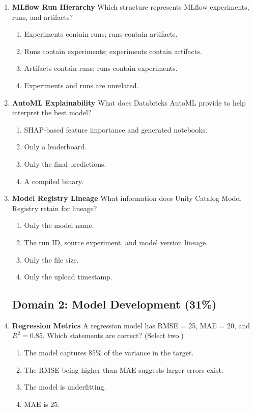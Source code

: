 \documentclass{article}
\begin{document}
\begin{enumerate}[label=\textbf{Q\arabic*.}]
		\item \textbf{MLflow Run Hierarchy}
		Which structure represents MLflow experiments, runs, and artifacts?
		\begin{enumerate}[label=\Alph*.]
			\item Experiments contain runs; runs contain artifacts.
			\item Runs contain experiments; experiments contain artifacts.
			\item Artifacts contain runs; runs contain experiments.
			\item Experiments and runs are unrelated.
		\end{enumerate}
		
		\item \textbf{AutoML Explainability}
		What does Databricks AutoML provide to help interpret the best model?
		\begin{enumerate}[label=\Alph*.]
			\item SHAP-based feature importance and generated notebooks.
			\item Only a leaderboard.
			\item Only the final predictions.
			\item A compiled binary.
		\end{enumerate}
		
		\item \textbf{Model Registry Lineage}
		What information does Unity Catalog Model Registry retain for lineage?
		\begin{enumerate}[label=\Alph*.]
			\item Only the model name.
			\item The run ID, source experiment, and model version lineage.
			\item Only the file size.
			\item Only the upload timestamp.
		\end{enumerate}
		
		\subsection*{Domain 2: Model Development (31\%)}
		
		\item \textbf{Regression Metrics}
		A regression model has RMSE = 25, MAE = 20, and $R^2 = 0.85$. Which statements are correct? (Select two.)
		\begin{enumerate}[label=\Alph*.]
			\item The model captures 85\% of the variance in the target.
			\item The RMSE being higher than MAE suggests larger errors exist.
			\item The model is underfitting.
			\item MAE is 25.
		\end{enumerate}
		

\end{enumerate}
\end{document}
